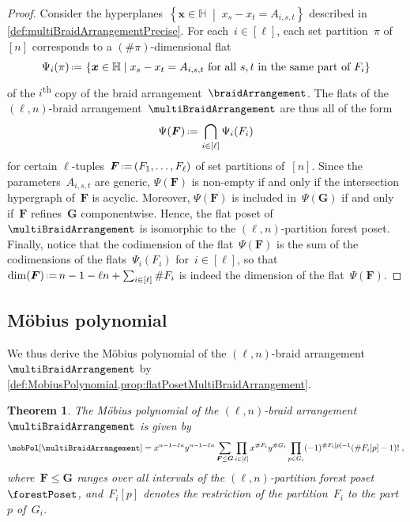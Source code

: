 \documentclass{amsart}
\newtheorem{theorem}{Theorem}[section]
\theoremstyle{definition}
\renewcommand{\b}[1]{{\boldsymbol{#1}}} %
\newcommand{\set}[2]{\left\{ #1 \;\middle|\; #2 \right\}} %
\newcommand{\eqdef}{\mbox{\,\raisebox{0.2ex}{\scriptsize\ensuremath{\mathrm:}}\ensuremath{=}\,}} %
\newcommand{\ordinal}{\textsuperscript{th}} %
\renewcommand{\b}[1]{\boldsymbol{#1}} %
\newcommand{\HH}{\mathbb{H}} %
\begin{document}
\begin{proof}
Consider the hyperplanes~$\set{\b{x} \in \HH}{x_s - x_t = A_{i,s,t}}$ described in \cref{def:multiBraidArrangementPrecise}.
For each~${i \in [\ell]}$, each set partition~$\pi$ of~$[n]$ corresponds to a $(\#\pi)$-dimensional flat
\[
\Psi_i(\pi) \eqdef \set{\b{x} \in \HH}{x_s - x_t = A_{i,s,t} \text{ for all $s,t$ in the same part of $F_i$} }
\]
of the $i$\ordinal{} copy of the braid arrangement~$\braidArrangement$.
The flats of the $(\ell,n)$-braid arrangement~$\multiBraidArrangement$ are thus all of the form
\[
\Psi(\b{F}) \eqdef \bigcap_{i \in [\ell]} \Psi_i(F_i)
\]
for certain $\ell$-tuples~$\b{F} \eqdef (F_1, \dots, F_\ell)$ of set partitions of~$[n]$.
Since the parameters~$A_{i,s,t}$ are generic, $\Psi(\b{F})$ is non-empty if and only if the intersection hypergraph of~$\b{F}$ is acyclic.
Moreover, $\Psi(\b{F})$ is included in~$\Psi(\b{G})$ if and only if~$\b{F}$ refines~$\b{G}$ componentwise.
Hence, the flat poset of~$\multiBraidArrangement$ is isomorphic to the $(\ell,n)$-partition forest poset.
Finally, notice that the codimension of the flat~$\Psi(\b{F})$ is the sum of the codimensions of the flats~$\Psi_i(F_i)$ for~$i \in [\ell]$, so that~$\dim(\b{F}) \eqdef n - 1 - \ell n + \sum_{i \in [\ell]} \#F_i $ is indeed the dimension of the flat~$\Psi(\b{F})$.
\end{proof}


\subsection{M\"obius polynomial}
\label{subsec:MobiusPolynomialMultiBraidArrangement}

We thus derive the M\"obius polynomial of the $(\ell,n)$-braid arrangement~$\multiBraidArrangement$ by \cref{def:MobiusPolynomial,prop:flatPosetMultiBraidArrangement}.

\begin{theorem}
\label{thm:MobiusPolynomialMultiBraidArrangement}
The M\"obius polynomial of the $(\ell,n)$-braid arrangement~$\multiBraidArrangement$ is given by
\[
\mobPol[\multiBraidArrangement] = x^{n-1-\ell n} y^{n-1-\ell n} \sum_{\b{F} \le \b{G}} \prod_{i \in [\ell]} x^{\#F_i} y^{\#G_i} \prod_{p \in G_i} (-1)^{\#F_i[p]-1} (\# F_i[p]-1)! \; ,
\]
where~$\b{F} \le \b{G}$ ranges over all intervals of the $(\ell,n)$-partition forest poset~$\forestPoset$, and~$F_i[p]$ denotes the restriction of the partition~$F_i$ to the part~$p$ of~$G_i$.
\end{theorem}
\end{document}
